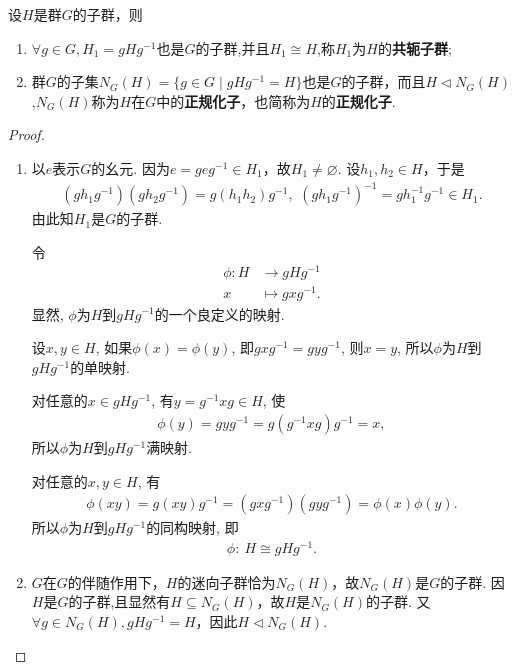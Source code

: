\documentclass[../../main.tex]{subfiles}%
\begin{document}
\begin{theorem}\label{theorem:共轭子群和正规化子}
设$H$是群$G$的子群，则
\begin{enumerate}[(1)]
\item $\forall g \in G, H_1 = gHg^{-1}$也是$G$的子群,并且$H_1\cong H$,称$H_1$为$H$的\textbf{共轭子群};

\item 群$G$的子集$N_G(H) = \{g \in G \mid gHg^{-1} = H\}$也是$G$的子群，而且$H \lhd N_G(H)$,$N_G(H)$称为$H$在$G$中的\textbf{正规化子}，也简称为$H$的\textbf{正规化子}.
\end{enumerate}
\end{theorem}
\begin{proof}
\begin{enumerate}[(1)]
\item 以$e$表示$G$的幺元. 因为$e = geg^{-1} \in H_1$，故$H_1 \neq \varnothing$. 设$h_1, h_2 \in H$，于是
\begin{align*}
(gh_1g^{-1})(gh_2g^{-1}) = g(h_1h_2)g^{-1},\,\,(gh_1g^{-1})^{-1} = gh_1^{-1}g^{-1} \in H_1.
\end{align*}
由此知$H_1$是$G$的子群.

令
\begin{align*}
\phi: H &\to gHg^{-1} \\
x &\mapsto gxg^{-1}.
\end{align*}
显然, $\phi$为$H$到$gHg^{-1}$的一个良定义的映射.

设$x,y\in H$, 如果$\phi(x)=\phi(y)$, 即$gxg^{-1}=gyg^{-1}$, 则$x=y$, 所以$\phi$为$H$到$gHg^{-1}$的单映射.

对任意的$x\in gHg^{-1}$, 有$y=g^{-1}xg\in H$, 使
\begin{align*}
\phi(y) = gyg^{-1} = g(g^{-1}xg)g^{-1} = x,
\end{align*}
所以$\phi$为$H$到$gHg^{-1}$满映射.

对任意的$x,y\in H$, 有
\begin{align*}
\phi(xy) = g(xy)g^{-1} = (gxg^{-1})(gyg^{-1}) = \phi(x)\phi(y).
\end{align*}
所以$\phi$为$H$到$gHg^{-1}$的同构映射, 即
\begin{align*}
\phi: \ H \cong gHg^{-1}.
\end{align*}

\item $G$在$G$的伴随作用下，$H$的迷向子群恰为$N_G(H)$，故$N_G(H)$是$G$的子群. 因$H$是$G$的子群,且显然有$H \subseteq N_G(H)$，故$H$是$N_G(H)$的子群. 又$\forall g \in N_G(H), gHg^{-1} = H$，因此$H \lhd N_G(H)$.
\end{enumerate}
\end{proof}
\end{document}

